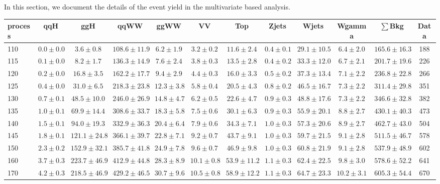 In this section, we document the details of the event yield in 
the multivariate based analysis.

\begin{table}[!htb]
{%
 \tiny
 \begin{center}
 \begin{tabular}{l | c c | c c c c c c c  | c c}
 \hline
 process & qqH & ggH & qqWW & ggWW & VV & Top & Zjets & Wjets & Wgamma & $\sum$Bkg & Data \\
 \hline
110 & $0.0\pm0.0$ & $3.6\pm0.8$ & $108.6\pm11.9$ & $6.2\pm1.9$ & $3.2\pm0.2$ & $11.6\pm2.4$ & $0.4\pm0.1$ & $29.1\pm10.5$ & $6.4\pm2.0$ & $165.6\pm16.3$ & 188 \\
115 & $0.1\pm0.0$ & $8.2\pm1.7$ & $136.3\pm14.9$ & $7.6\pm2.4$ & $3.8\pm0.3$ & $13.5\pm2.8$ & $0.4\pm0.2$ & $33.3\pm12.0$ & $6.7\pm2.1$ &  $201.7\pm19.6$ & 226 \\
120 & $0.2\pm0.0$ & $16.8\pm3.5$ & $162.2\pm17.7$ & $9.4\pm2.9$ & $4.4\pm0.3$ & $16.0\pm3.3$ & $0.5\pm0.2$ & $37.3\pm13.4$ & $7.1\pm2.2$ & $236.8\pm22.8$ & 266 \\
125 & $0.4\pm0.0$ & $31.0\pm6.5$ & $218.3\pm23.8$ & $12.3\pm3.8$ & $5.8\pm0.4$ & $20.5\pm4.3$ & $0.8\pm0.2$ & $46.5\pm16.7$ & $7.3\pm2.2$ & $311.4\pm29.8$ & 351 \\
130 & $0.7\pm0.1$ & $48.5\pm10.0$ & $246.0\pm26.9$ & $14.8\pm4.7$ & $6.2\pm0.5$ & $22.6\pm4.7$ & $0.9\pm0.3$ & $48.8\pm17.6$ & $7.3\pm2.2$ & $346.6\pm32.8$ & 382 \\
135 & $1.0\pm0.1$ & $69.9\pm14.4$ & $308.6\pm33.7$ & $18.3\pm5.8$ & $7.5\pm0.6$ & $30.1\pm6.3$ & $0.9\pm0.3$ & $55.9\pm20.1$ & $8.8\pm2.7$ & $430.1\pm40.3$ & 473 \\
140 & $1.5\pm0.1$ & $94.0\pm19.3$ & $332.9\pm36.3$ & $20.4\pm6.4$ & $7.9\pm0.6$ & $34.3\pm7.1$ & $1.0\pm0.3$ & $57.3\pm20.6$ & $8.9\pm2.7$ & $462.7\pm43.0$ & 504 \\
145 & $1.8\pm0.1$ & $121.1\pm24.8$ & $366.1\pm39.7$ & $22.8\pm7.1$ & $9.2\pm0.7$ & $43.7\pm9.1$ & $1.0\pm0.3$ & $59.7\pm21.5$ & $9.1\pm2.8$ & $511.5\pm46.7$ & 578 \\
150 & $2.3\pm0.2$ & $152.9\pm32.1$ & $385.7\pm41.8$ & $24.9\pm7.8$ & $9.6\pm0.7$ & $46.9\pm9.8$ & $1.0\pm0.3$ & $60.8\pm21.9$ & $9.1\pm2.8$ & $537.9\pm48.9$ & 602 \\
160 & $3.7\pm0.3$ & $223.7\pm46.9$ & $412.9\pm44.8$ & $28.3\pm8.9$ & $10.1\pm0.8$ & $53.9\pm11.2$ & $1.1\pm0.3$ & $62.4\pm22.5$ & $9.8\pm3.0$ & $578.6\pm52.2$ & 641 \\
170 & $4.2\pm0.3$ & $218.5\pm46.9$ & $429.2\pm46.5$ & $30.7\pm9.6$ & $10.5\pm0.8$ & $58.9\pm12.2$ & $1.1\pm0.3$ & $64.7\pm23.3$ & $10.2\pm3.1$ & $605.3\pm54.4$ & 670 \\

\end{tabular}
\end{center}}
\end{table}
